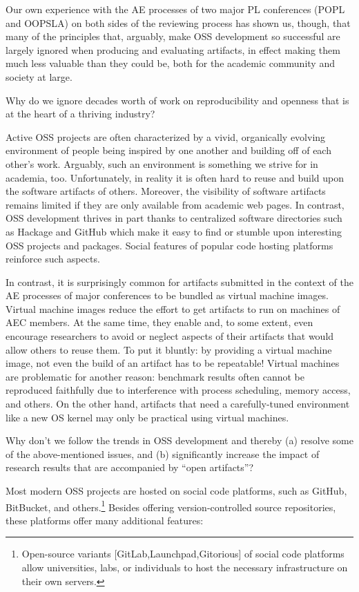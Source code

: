 \documentclass[acmtocl]{acmtrans2m}
\begin{document}
Our own experience with the AE processes of two major PL conferences (POPL and
OOPSLA) on both sides of the reviewing process has shown us, though, that many
of the principles that, arguably, make OSS development so successful are
largely ignored when producing and evaluating artifacts, in effect making them
much less valuable than they could be, both for the academic community and
society at large.

Why do we ignore decades worth of work on reproducibility and openness that is
at the heart of a thriving industry?

Active OSS projects are often characterized by a vivid, organically evolving
environment of people being inspired by one another and building off of each
other's work. Arguably, such an environment is something we strive for in
academia, too. Unfortunately, in reality it is often hard to reuse and build
upon the software artifacts of others. Moreover, the visibility of software
artifacts remains limited if they are only available from academic web pages.
In contrast, OSS development thrives in part thanks to centralized software
directories such as Hackage and GitHub which make it easy to find or stumble
upon interesting OSS projects and packages. Social features of popular code
hosting platforms reinforce such aspects.

In contrast, it is surprisingly common for artifacts submitted in the context
of the AE processes of major conferences to be bundled as virtual machine
images. Virtual machine images reduce the effort to get artifacts to run on
machines of AEC members. At the same time, they enable and, to some extent,
even encourage researchers to avoid or neglect aspects of their artifacts that
would allow others to reuse them. To put it bluntly: by providing a virtual
machine image, not even the build of an artifact has to be repeatable! Virtual
machines are problematic for another reason: benchmark results often cannot be
reproduced faithfully due to interference with process scheduling, memory
access, and others. On the other hand, artifacts that need a carefully-tuned
environment like a new OS kernel may only be practical using virtual machines.

Why don't we follow the trends in OSS development and thereby (a) resolve some
of the above-mentioned issues, and (b) significantly increase the impact of
research results that are accompanied by ``open artifacts''?

Most modern OSS projects are hosted on social code platforms, such as GitHub,
BitBucket, and others.\footnote{Open-source variants
[GitLab,Launchpad,Gitorious] of social code platforms allow universities,
labs, or individuals to host the necessary infrastructure on their own
servers.} Besides offering version-controlled source repositories, these
platforms offer many additional features:
\end{document}
